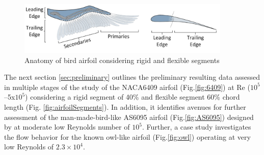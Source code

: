 \begin{figure}[hbt!]
\centering
\includegraphics[width=4in]{Figures/gamble inman.png}
\caption{\label{fig:segments} Anatomy of bird airfoil considering rigid and flexible segments \cite{Gamble2020a}}
\end{figure}

The next section \ref{sec:preliminary} outlines the preliminary resulting data assessed in multiple stages of the study of the NACA6409 airfoil (Fig.\ref{fig:6409}) at Re ($10^5$–5x$10^5$) considering a rigid segment of 40\% and flexible segment 60\% chord length (Fig. \ref{fig:airfoilSegments}). In addition, it identifies avenues for further assessment of the man-made-bird-like AS6095 airfoil (Fig.\ref{fig:AS6095}) designed by \citet{Ananda2018a} at moderate low Reynolds number of $10^5$. Further,  a case study investigates the flow behavior for the known owl-like airfoil (Fig.\ref{fig:owl}) operating at very low Reynolds of $2.3\times 10^4$.

